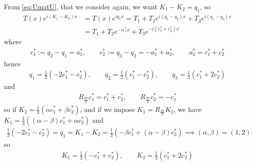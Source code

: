 \documentclass[11pt,a4paper,reqno,french,tikz]{amsart}
\newcommand{\pa}[1]{\left( #1 \right)} %
\newcommand{\f}[2]{\frac{#1}{#2}} %
\begin{document}
From \eqref{eq:UmatU}, that we consider again, we want $K_1- K_2 = q_1$, so 
\begin{align*}
	T(x) e^{i(K_1-K_2)x} &= T(x) e^{iq_1 x} = T_1 +T_2 e^{i(q_1 - q_2)x} +T_3 e^{i(q_1 - q_3)x} \\
& = T_1 +T_2 e^{-ic_1^*x} +T_3 e^{-i\pa{c_1^*+c_2^*}x}
\end{align*}
where
\begin{multline*}
c_1^* := q_2 - q_1 = a_1^*, \qquad c_2^* := q_3 - q_2 = -a_1^* + a_2^*, \qquad a_2^* = c_1^* + c_2^*
\end{multline*}
hence
\begin{align*}
q_1 = \f 13\pa{-2c_1^* - c_2^*}, \qquad q_2 = \f 13\pa{c_1^* - c_2^*},\qquad q_3 = \f 13\pa{c_1^* +2 c_2^*}
\end{align*}
and
\begin{align*}
R_{\f{2\pi}{6}} c_1^* = c_1^* + c_2^*, \qquad R_{\f{2\pi}{6}} c_2^* = -c_1^*
\end{align*}
so if $K_2 = \f 13 \pa{\alpha c_1^* + \beta c_2^*}$, and if we impose $K_1 = R_{\f{2\pi}{6}} K_2$, we have $K_1 = \f 13 \pa{\pa{\alpha - \beta} c_1^* + \alpha c_2^*}$ and
\begin{align*}
\f 13 \pa{-2c_1^* -c_2^*} = q_1 = K_1 - K_2 = \f 13\pa{-\beta c_1^* + \pa{\alpha - \beta} c_2^*} \implies (\alpha,\beta) = (1,2)
\end{align*}
so
\begin{align*}
K_1 = \f 13 \pa{ -c_1^* + c_2^*},\qquad K_2 = \f 13 \pa{c_1^* + 2c_2^*}
\end{align*}



\end{document}
